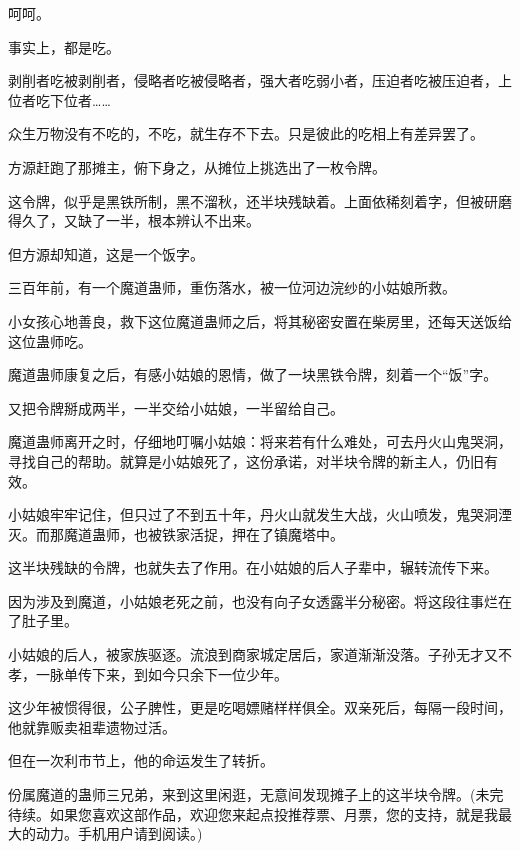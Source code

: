 \begin{this_body}
呵呵。

事实上，都是吃。

剥削者吃被剥削者，侵略者吃被侵略者，强大者吃弱小者，压迫者吃被压迫者，上位者吃下位者……

众生万物没有不吃的，不吃，就生存不下去。只是彼此的吃相上有差异罢了。

方源赶跑了那摊主，俯下身之，从摊位上挑选出了一枚令牌。

这令牌，似乎是黑铁所制，黑不溜秋，还半块残缺着。上面依稀刻着字，但被研磨得久了，又缺了一半，根本辨认不出来。

但方源却知道，这是一个饭字。

三百年前，有一个魔道蛊师，重伤落水，被一位河边浣纱的小姑娘所救。

小女孩心地善良，救下这位魔道蛊师之后，将其秘密安置在柴房里，还每天送饭给这位蛊师吃。

魔道蛊师康复之后，有感小姑娘的恩情，做了一块黑铁令牌，刻着一个“饭”字。

又把令牌掰成两半，一半交给小姑娘，一半留给自己。

魔道蛊师离开之时，仔细地叮嘱小姑娘：将来若有什么难处，可去丹火山鬼哭洞，寻找自己的帮助。就算是小姑娘死了，这份承诺，对半块令牌的新主人，仍旧有效。

小姑娘牢牢记住，但只过了不到五十年，丹火山就发生大战，火山喷发，鬼哭洞湮灭。而那魔道蛊师，也被铁家活捉，押在了镇魔塔中。

这半块残缺的令牌，也就失去了作用。在小姑娘的后人子辈中，辗转流传下来。

因为涉及到魔道，小姑娘老死之前，也没有向子女透露半分秘密。将这段往事烂在了肚子里。

小姑娘的后人，被家族驱逐。流浪到商家城定居后，家道渐渐没落。子孙无才又不孝，一脉单传下来，到如今只余下一位少年。

这少年被惯得很，公子脾性，更是吃喝嫖赌样样俱全。双亲死后，每隔一段时间，他就靠贩卖祖辈遗物过活。

但在一次利市节上，他的命运发生了转折。

份属魔道的蛊师三兄弟，来到这里闲逛，无意间发现摊子上的这半块令牌。(未完待续。如果您喜欢这部作品，欢迎您来起点投推荐票、月票，您的支持，就是我最大的动力。手机用户请到阅读。)

\end{this_body}

